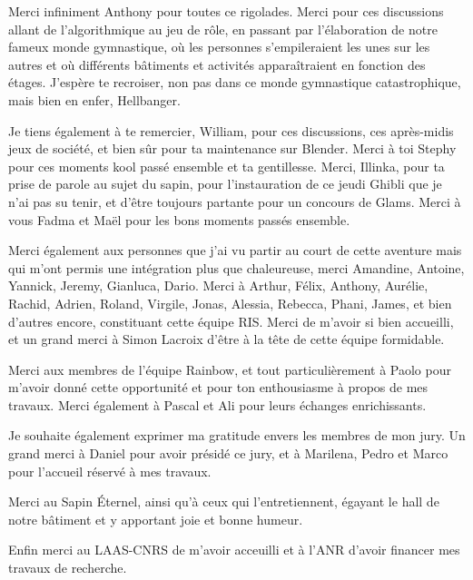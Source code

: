 Merci infiniment Anthony pour toutes ce rigolades.
Merci pour ces discussions allant de l'algorithmique au jeu de rôle, en passant par l'élaboration de notre fameux monde gymnastique, où les personnes s'empileraient les unes sur les autres et où différents bâtiments et activités apparaîtraient en fonction des étages.
J'espère te recroiser, non pas dans ce monde gymnastique catastrophique, mais bien en enfer, Hellbanger.

Je tiens également à te remercier, William, pour ces discussions, ces après-midis jeux de société, et bien sûr pour ta maintenance sur Blender.
Merci à toi Stephy pour ces moments kool passé ensemble et ta gentillesse.
Merci, Illinka, pour ta prise de parole au sujet du sapin, pour l'instauration de ce jeudi Ghibli que je n'ai pas su tenir, et d'être toujours partante pour un concours de Glams.
Merci à vous Fadma et Maël pour les bons moments passés ensemble.

Merci également aux personnes que j'ai vu partir au court de cette aventure mais qui m'ont permis une intégration plus que chaleureuse, merci Amandine, Antoine, Yannick, Jeremy, Gianluca, Dario.
Merci à Arthur, Félix, Anthony, Aurélie, Rachid, Adrien, Roland, Virgile, Jonas, Alessia, Rebecca, Phani, James, et bien d’autres encore, constituant cette équipe RIS.
Merci de m’avoir si bien accueilli, et un grand merci à Simon Lacroix d'être à la tête de cette équipe formidable.

Merci aux membres de l’équipe Rainbow, et tout particulièrement à Paolo pour m’avoir donné cette opportunité et pour ton enthousiasme à propos de mes travaux. 
Merci également à Pascal et Ali pour leurs échanges enrichissants.

Je souhaite également exprimer ma gratitude envers les membres de mon jury.
Un grand merci à Daniel pour avoir présidé ce jury, et à Marilena, Pedro et Marco pour l’accueil réservé à mes travaux.

Merci au Sapin Éternel, ainsi qu’à ceux qui l’entretiennent, égayant le hall de notre bâtiment et y apportant joie et bonne humeur.

Enfin merci au LAAS-CNRS de m'avoir acceuilli et à l'ANR d'avoir financer mes travaux de recherche.